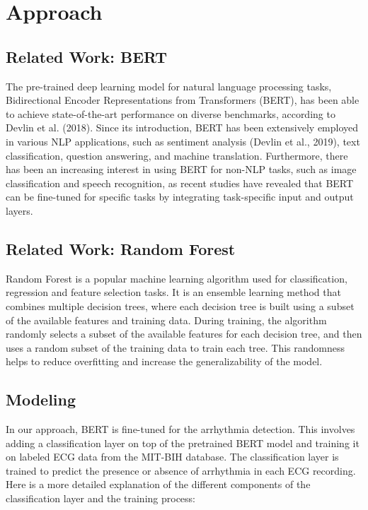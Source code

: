 \section{Approach}

\subsection{Related Work: BERT}
The pre-trained deep learning model for natural language processing tasks, Bidirectional Encoder Representations from Transformers (BERT), has been able to achieve state-of-the-art performance on diverse benchmarks, according to Devlin et al. (2018). Since its introduction, BERT has been extensively employed in various NLP applications, such as sentiment analysis (Devlin et al., 2019), text classification, question answering, and machine translation. Furthermore, there has been an increasing interest in using BERT for non-NLP tasks, such as image classification and speech recognition, as recent studies have revealed that BERT can be fine-tuned for specific tasks by integrating task-specific input and output layers.

\nocite{BERT}

\subsection{Related Work: Random Forest}
Random Forest is a popular machine learning algorithm used for classification, regression and feature selection tasks. It is an ensemble learning method that combines multiple decision trees, where each decision tree is built using a subset of the available features and training data. During training, the algorithm randomly selects a subset of the available features for each decision tree, and then uses a random subset of the training data to train each tree. This randomness helps to reduce overfitting and increase the generalizability of the model.


\subsection{Modeling}

In our approach, BERT is fine-tuned for the arrhythmia detection. This involves adding a classification layer on top of the pretrained BERT model and training it on labeled ECG data from the MIT-BIH database. The classification layer is trained to predict the presence or absence of arrhythmia in each ECG recording. Here is a more detailed explanation of the different components of the classification layer and the training process:

